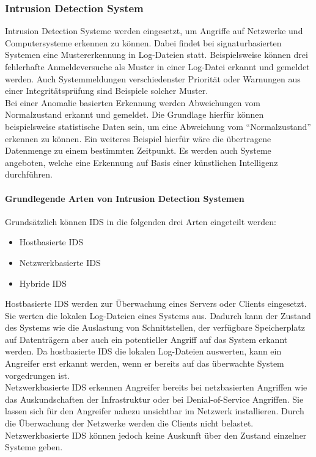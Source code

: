 \newpage
\subsubsection{Intrusion Detection System}

Intrusion Detection Systeme werden eingesetzt, um Angriffe auf Netzwerke und Computersysteme erkennen zu können. Dabei findet bei signaturbasierten Systemen eine Mustererkennung in Log-Dateien statt. Beispielsweise können drei fehlerhafte Anmeldeversuche als Muster in einer Log-Datei erkannt und gemeldet werden. Auch Systemmeldungen verschiedenster Priorität oder Warnungen aus einer Integritätsprüfung sind Beispiele solcher Muster.\\
Bei einer Anomalie basierten Erkennung werden Abweichungen vom Normalzustand erkannt und gemeldet. Die Grundlage hierfür können beispielsweise statistische Daten sein, um eine Abweichung vom "`Normalzustand"' erkennen zu können. Ein weiteres Beispiel hierfür wäre die übertragene Datenmenge zu einem bestimmten Zeitpunkt. Es werden auch Systeme angeboten, welche eine Erkennung auf Basis einer künstlichen Intelligenz durchführen.   

\paragraph{Grundlegende Arten von Intrusion Detection Systemen}
Grundsätzlich können \ac{IDS} in die folgenden drei Arten eingeteilt werden:

\begin{itemize}
\item Hostbasierte \ac{IDS}
\item Netzwerkbasierte \ac{IDS}
\item Hybride \ac{IDS}
\end{itemize}

\noindent Hostbasierte \ac{IDS} werden zur Überwachung eines Servers oder Clients eingesetzt. Sie werten die lokalen Log-Dateien eines Systems aus. Dadurch kann der Zustand des Systems wie die Auslastung von Schnittstellen, der verfügbare Speicherplatz auf Datenträgern aber auch ein potentieller Angriff auf das System erkannt werden. Da hostbasierte \ac{IDS} die lokalen Log-Dateien auswerten, kann ein Angreifer erst erkannt werden, wenn er bereits auf das überwachte System vorgedrungen ist.\\ 

\noindent Netzwerkbasierte \ac{IDS} erkennen Angreifer bereits bei netzbasierten Angriffen wie das Auskundschaften der Infrastruktur oder bei Denial-of-Service Angriffen. Sie lassen sich für den Angreifer nahezu unsichtbar im Netzwerk installieren. Durch die Überwachung der Netzwerke werden die Clients nicht belastet. Netzwerkbasierte \ac{IDS} können jedoch keine Auskunft über den Zustand einzelner Systeme geben.\\ 

